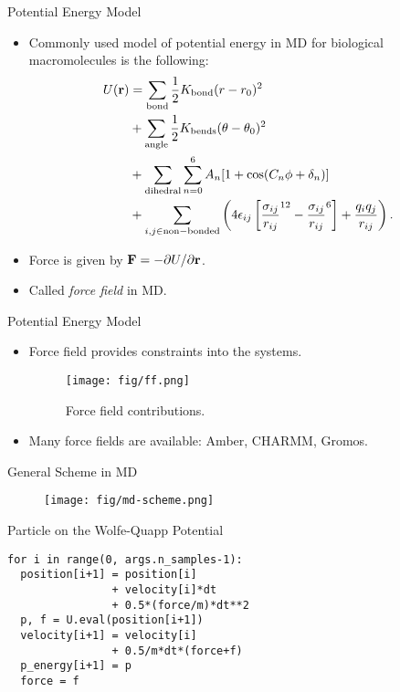 \documentclass[10pt]{beamer}
\begin{document}
\begin{frame}{Potential Energy Model}
\begin{itemize}
\setlength\itemsep{1em}
  \item Commonly used model of potential energy in MD for biological macromolecules is the following:
  \begin{align}
    U({\bf r})
      &= \sum_\mathrm{bond} \frac{1}{2} K_\mathrm{bond} (r-r_0)^2 \\
      &+ \sum_\mathrm{angle} \frac{1}{2} K_\mathrm{bends} (\theta-\theta_0)^2 \\
      &+ \sum_\mathrm{dihedral} \sum_{n=0}^6 A_n [1+\cos(C_n \phi + \delta_n)] \\
      &+ \sum_{i,j\in \mathrm{non-bonded}} \left( 4\epsilon_{ij} \left[ \frac{\sigma_{ij}}{r_{ij}}^{12} - \frac{\sigma_{ij}}{r_{ij}}^6 \right] + \frac{q_i q_j}{r_{ij}} \right).
  \end{align}

  \item Force is given by $\mathbf{F} = -\partial{U}/\partial{{\bf r}}$.

  \item Called \textit{force field} in MD.
\end{itemize}
\end{frame}

\begin{frame}{Potential Energy Model}
\begin{itemize}
  \item Force field provides constraints into the systems.
  \begin{figure}
    \texttt{[image: fig/ff.png]}
    \caption{Force field contributions.}
  \end{figure}

  \item Many force fields are available: Amber, CHARMM, Gromos.
\end{itemize}
\end{frame}

\begin{frame}{General Scheme in MD}
\begin{figure}
  \texttt{[image: fig/md-scheme.png]}
\end{figure}
\end{frame}

\begin{frame}[fragile]{Particle on the Wolfe-Quapp Potential}
\begin{lstlisting}
for i in range(0, args.n_samples-1):
  position[i+1] = position[i]
                + velocity[i]*dt
                + 0.5*(force/m)*dt**2
  p, f = U.eval(position[i+1])
  velocity[i+1] = velocity[i]
                + 0.5/m*dt*(force+f)
  p_energy[i+1] = p
  force = f
\end{lstlisting}
\end{frame}
\end{document}
